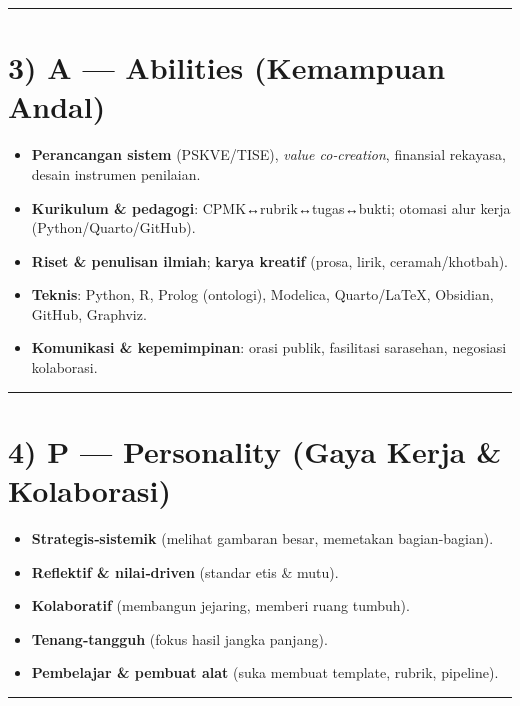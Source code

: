 \documentclass[
  letterpaper,
  DIV=11,
  numbers=noendperiod]{scrreprt}
\providecommand{\tightlist}{%
  \setlength{\itemsep}{0pt}\setlength{\parskip}{0pt}}
\begin{document}
\begin{center}\rule{0.5\linewidth}{0.5pt}\end{center}

\section{3) A --- Abilities (Kemampuan
Andal)}\label{a-abilities-kemampuan-andal}

\begin{itemize}
\tightlist
\item
  \textbf{Perancangan sistem} (PSKVE/TISE), \emph{value co‑creation},
  finansial rekayasa, desain instrumen penilaian.
\item
  \textbf{Kurikulum \& pedagogi}: CPMK↔rubrik↔tugas↔bukti; otomasi alur
  kerja (Python/Quarto/GitHub).
\item
  \textbf{Riset \& penulisan ilmiah}; \textbf{karya kreatif} (prosa,
  lirik, ceramah/khotbah).
\item
  \textbf{Teknis}: Python, R, Prolog (ontologi), Modelica, Quarto/LaTeX,
  Obsidian, GitHub, Graphviz.
\item
  \textbf{Komunikasi \& kepemimpinan}: orasi publik, fasilitasi
  sarasehan, negosiasi kolaborasi.
\end{itemize}

\begin{center}\rule{0.5\linewidth}{0.5pt}\end{center}

\section{4) P --- Personality (Gaya Kerja \&
Kolaborasi)}\label{p-personality-gaya-kerja-kolaborasi}

\begin{itemize}
\tightlist
\item
  \textbf{Strategis‑sistemik} (melihat gambaran besar, memetakan
  bagian-bagian).
\item
  \textbf{Reflektif \& nilai‑driven} (standar etis \& mutu).
\item
  \textbf{Kolaboratif} (membangun jejaring, memberi ruang tumbuh).
\item
  \textbf{Tenang‑tangguh} (fokus hasil jangka panjang).
\item
  \textbf{Pembelajar \& pembuat alat} (suka membuat template, rubrik,
  pipeline).
\end{itemize}

\begin{center}\rule{0.5\linewidth}{0.5pt}\end{center}
\end{document}
